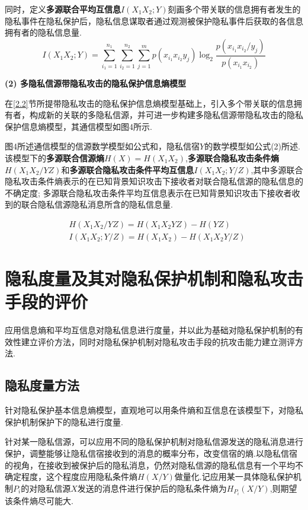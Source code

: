 同时，定义\textbf{多源联合平均互信息}$I(X_{1}X_{2};Y)$刻画多个带关联的信息拥有者发生的隐私事件在隐私保护后，隐私信息谋取者通过观测被保护隐私事件后获取的各信息拥有者的隐私信息量.
\begin{equation}
I(X_{1}X_{2};Y)=\sum_{i_{1}=1}^{n_{1}}\sum_{i_{2}=1}^{n_{2}}\sum_{j=1}^{m}p(x_{i_{1}}x_{i_{2}}y_{j})\log_{2}\frac{p(x_{i_{1}}x_{i_{2}}/y_{j})}{p(x_{i_{1}}x_{i_{2}})}
\end{equation}

\textbf{(2) 多隐私信源带隐私攻击的隐私保护信息熵模型}

在\ref{2.2}节所提带隐私攻击的隐私保护信息熵模型基础上，引入多个带关联的信息拥有者，构成新的关联的多隐私信源，并可进一步构建多隐私信源带隐私攻击的隐私保护信息熵模型，其通信模型如图4所示.


图4所述通信模型的信源数学模型如公式和，隐私信宿$Y$的数学模型如公式(2)所述.该模型下的\textbf{多源联合信源熵}$H(X)=H(X_{1}X_{2})$,\textbf{多源联合隐私攻击条件熵}$H(X_{1}X_{2}/YZ)$和\textbf{多源联合隐私攻击条件平均互信息}$I(X_{1}X_{2};Y/Z)$,其中多源联合隐私攻击条件熵表示的在已知背景知识攻击下接收者对联合隐私信源的隐私信息的不确定度; 多源联合隐私攻击条件平均互信息表示在已知背景知识攻击下接收者收到的联合隐私信源隐私消息所含的隐私信息量.

\begin{equation}
\begin{split}
&H(X_{1}X_{2}/YZ)=H(X_{1}X_{2}YZ)-H(YZ)\\
&I(X_{1}X_{2};Y/Z)=H(X_{1}X_{2})-H(X_{1}X_{2}Y/Z)
\end{split}
\end{equation}

\section{隐私度量及其对隐私保护机制和隐私攻击手段的评价}\label{Privacy measures}
应用信息熵和平均互信息对隐私信息进行度量，并以此为基础对隐私保护机制的有效性建立评价方法，同时对隐私保护机制对隐私攻击手段的抗攻击能力建立测评方法.

\subsection{隐私度量方法}
针对隐私保护基本信息熵模型，直观地可以用条件熵和互信息在该模型下，对隐私保护机制保护下的隐私进行度量.

针对某一隐私信源，可以应用不同的隐私保护机制对隐私信源发送的隐私消息进行保护，调整能够让隐私信宿接收到的消息的概率分布，改变信宿的熵.以隐私信宿的视角，在接收到被保护后的隐私消息，仍然对隐私信源的隐私信息有一个平均不确定程度，这个程度应用隐私条件熵$H(X/Y)$做量化.记应用某一具体隐私保护机制$P_{i}$的对隐私信源$X$发送的消息件进行保护后的隐私条件熵为$H_{P_{i}}(X/Y)$,则期望该条件熵尽可能大.

